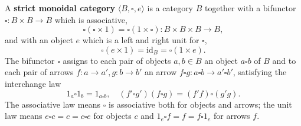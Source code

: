 A \textbf{strict monoidal category} $\langle B, \square, e \rangle$ is a category $B$ together with a bifunctor $\square : B \times B \to B$ which is associative,
$$\square(\square \times 1) = \square(1 \times \square) : B \times B \times B \to B,$$
and with an object $e$ which is a left and right unit for $\square$,
$$\square(e \times 1) = \mathrm{id}_B = \square(1 \times e).$$
The bifunctor $\square$ assigns to each pair of objects $a, b \in B$ an object $a \square b$ of $B$ and to each pair of arrows $f : a \to a', g : b \to b'$ an arrow $f \square g : a \square b \to a' \square b'$, satisfying the interchange law
$$1_a \square 1_b = 1_{a \square b}, \quad (f' \square g') (f \square g) = (f' f) \square (g' g).$$
The associative law means $\square$ is associative both for objects and arrows; the unit law means $e \square c = c = c \square e$ for objects $c$ and $1_e \square f = f = f \square 1_e$ for arrows $f$.

